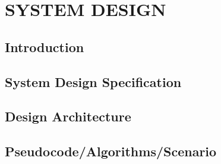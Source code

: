 \chapter{SYSTEM DESIGN}
\pagebreak

\section{Introduction}
\label{sec:sd-intro}


\section{System Design Specification}
\label{sec:sd-spec}


\section{Design Architecture}
\label{sec:sd-arch}


\section{Pseudocode/Algorithms/Scenario}
\label{sec:sd-algo}


